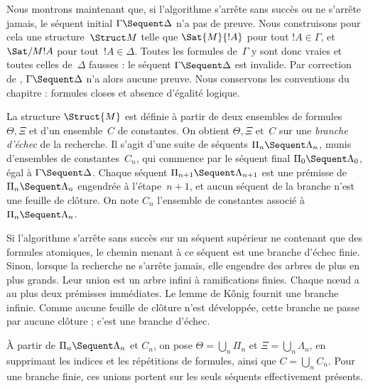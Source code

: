 \documentclass[../../../include/open-logic-section]{subfiles}
\begin{document}


Nous montrons maintenant que, si l'algorithme s'arrête
sans succès ou ne s'arrête jamais, le séquent initial
$\Gamma \Sequent \Delta$ n'a pas de preuve.
Nous construisons pour cela une structure~$\Struct M$
telle que $\Sat{M}{!A}$ pour tout $!A \in \Gamma$,
et $\Sat/{M}{!A}$ pour tout~$!A \in \Delta$.
Toutes les formules de~$\Gamma$ y sont donc vraies
et toutes celles de~$\Delta$ fausses : le séquent
$\Gamma \Sequent \Delta$ est invalide. Par correction
de , $\Gamma \Sequent \Delta$ n'a alors
aucune preuve. Nous conservons les conventions
du chapitre : formules closes et absence d'égalité logique.

La structure $\Struct{M}$ est définie à partir de
deux ensembles de formules $\Theta, \Xi$ et d'un
ensemble~$C$ de constantes. On obtient $\Theta, \Xi$
et~$C$ sur une \emph{branche d'échec} de la recherche.
Il s'agit d'une suite de séquents
$\Pi_n \Sequent \Lambda_n$, munis d'ensembles de
constantes~$C_n$, qui commence par le séquent final
$\Pi_0 \Sequent \Lambda_0$, égal à $\Gamma \Sequent \Delta$.
Chaque séquent $\Pi_{n+1} \Sequent \Lambda_{n+1}$
est une prémisse de $\Pi_n \Sequent \Lambda_n$
engendrée à l'étape~$n+1$, et aucun séquent
de la branche n'est une feuille de clôture.
On note $C_n$ l'ensemble de constantes associé
à~$\Pi_n \Sequent \Lambda_n$.

Si l'algorithme s'arrête sans succès sur un séquent
supérieur ne contenant que des formules atomiques,
le chemin menant à ce séquent est une branche
d'échec finie. Sinon, lorsque la recherche ne
s'arrête jamais, elle engendre des arbres de
plus en plus grands. Leur union est un arbre
infini à ramifications finies. Chaque nœud
a au plus deux prémisses immédiates.
Le lemme de K\H{o}nig fournit une branche infinie.
Comme aucune feuille de clôture n'est développée,
cette branche ne passe par aucune clôture ;
c'est une branche d'échec.

À partir de $\Pi_n \Sequent \Lambda_n$ et $C_n$,
on pose $\Theta = \bigcup_n \Pi_n$ et
$\Xi = \bigcup_n \Lambda_n$, en supprimant les
indices et les répétitions de formules, ainsi que
$C = \bigcup_n C_n$. Pour une branche finie,
ces unions portent sur les seuls séquents
effectivement présents.
\end{document}
